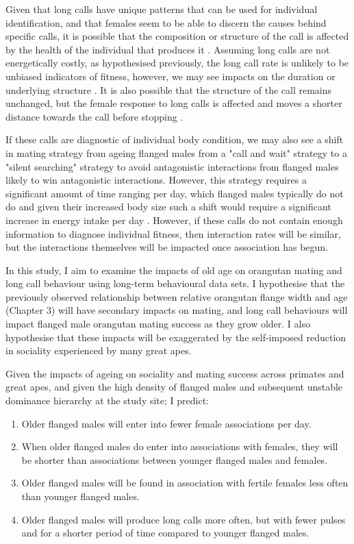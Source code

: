 Given that long calls have unique patterns that can be used for individual identification, and that females seem to be able to discern the causes behind specific calls, it is possible that the composition or structure of the call is affected by the health of the individual that produces it \citep{Spillmann.2017}. Assuming long calls are not energetically costly, as hypothesised previously, the long call rate is unlikely to be unbiased indicators of fitness, however, we may see impacts on the duration or underlying structure \citep{Zahavi.1975}. It is also possible that the structure of the call remains unchanged, but the female response to long calls is affected and moves a shorter distance towards the call before stopping \citep{Spillmann.2010}.

If these calls are diagnostic of individual body condition, we may also see a shift in mating strategy from ageing flanged males from a "call and wait" strategy to a "silent searching" strategy to avoid antagonistic interactions from flanged males likely to win antagonistic interactions. However, this strategy requires a significant amount of time ranging per day, which flanged males typically do not do and given their increased body size such a shift would require a significant increase in energy intake per day \citep{Prasetyo.2021}. However, if these calls do not contain enough information to diagnose individual fitness, then interaction rates will be similar, but the interactions themselves will be impacted once association has begun. 

In this study, I aim to examine the impacts of old age on orangutan mating and long call behaviour using long-term behavioural data sets. I hypothesise that the previously observed relationship between relative orangutan flange width and age (Chapter 3) will have secondary impacts on mating, and long call behaviours will impact flanged male orangutan mating success as they grow older. I also hypothesise that these impacts will be exaggerated by the self-imposed reduction in sociality experienced by many great apes.

Given the impacts of ageing on sociality and mating success across primates and great apes, and given the high density of flanged males and subsequent unstable dominance hierarchy at the study site; I predict:

\begin{enumerate}
    \item   Older flanged males will enter into fewer female associations per day.

    \item When older flanged males do enter into associations with females, they will be shorter than associations between younger flanged males and females.

    \item Older flanged males will be found in association with fertile females less often than younger flanged males.

    \item Older flanged males will produce long calls more often, but with fewer pulses and for a shorter period of time compared to younger flanged males.
\end{enumerate}


